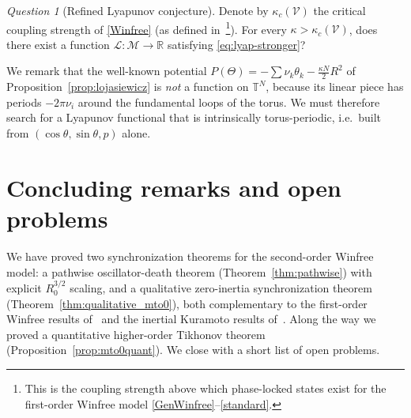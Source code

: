 \documentclass[11pt,reqno]{amsart}
\newcommand{\T}{\mathbb{T}}
\theoremstyle{definition}
\theoremstyle{remark}
\newtheorem{question}[lemma]{Question}
\begin{document}
\begin{question}[Refined Lyapunov conjecture]\label{conj:lyapunov}
	Denote by $\kappa_c(\mathcal V)$ the critical coupling strength of
	\eqref{Winfree} (as defined
	in~\cite{ryoo2026oscillator}\footnote{This is the coupling strength
		above which phase-locked states exist for the first-order Winfree
		model \eqref{GenWinfree}--\eqref{standard}.}). For every
	$\kappa>\kappa_c(\mathcal V)$, does there exist a function $\mathcal{L}:\mathcal{M}\to \mathbb{R}$ satisfying \eqref{eq:lyap-stronger}?
\end{question}

We remark that the well-known potential  $P(\Theta)=-\sum\nu_k\theta_k-\tfrac{\kappa N}{2}R^2$
of Proposition~\ref{prop:lojasiewicz} is \emph{not} a function on
$\T^N$, because its linear piece has periods $-2\pi\nu_i$ around the
fundamental loops of the torus. We must therefore search for a
Lyapunov functional that is intrinsically torus-periodic, i.e.\ built
from $(\cos\theta,\sin\theta,p)$ alone.





\section{Concluding remarks and open problems}\label{sec:conclusion}

We have proved two synchronization theorems for the second-order
Winfree model: a pathwise oscillator-death theorem
(Theorem~\ref{thm:pathwise}) with explicit $R_0^{3/2}$ scaling, and a
qualitative zero-inertia synchronization theorem
(Theorem~\ref{thm:qualitative_mto0}), both complementary to the
first-order Winfree results of~\cite{ryoo2026oscillator} and the
inertial Kuramoto results
of~\cite{cho2025quantitative,cho2025inertia}. Along the way we proved
a quantitative higher-order Tikhonov theorem
(Proposition~\ref{prop:mto0quant}). We close with a short list of open
problems.
\end{document}
